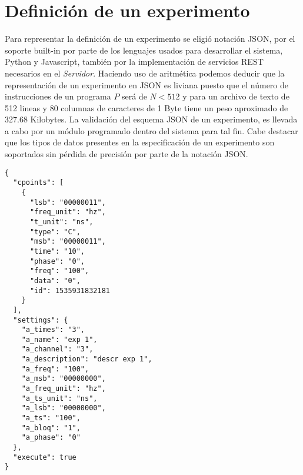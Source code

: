 \section{Definici\'on de un experimento}

Para representar la definici\'on de un experimento se eligi\'o notaci\'on JSON, 
por el soporte built-in por parte de los lenguajes usados para desarrollar el sistema, 
Python y Javascript, tambi\'en por la implementaci\'on de servicios REST necesarios 
en el \textit{Servidor}\cite{json_standar}.
Haciendo uso de aritm\'etica podemos deducir que la representaci\'on de un experimento en JSON
es liviana puesto que el n\'umero de instrucciones de un programa \(P\) ser\'a de \(N < 512 \) 
y para un archivo de texto de 512 lineas y 80 columnas de caracteres de 1 Byte 
tiene un peso aproximado de 327.68 Kilobytes.
La validaci\'on del esquema JSON de un experimento, es llevada a cabo por un m\'odulo programado
dentro del sistema para tal fin.
Cabe destacar que los tipos de datos presentes en la especificaci\'on de un experimento son
soportados sin p\'erdida de precisi\'on por parte de la notaci\'on JSON.\cite{json_ref}


\begin{lstlisting}
{
  "cpoints": [
    {
      "lsb": "00000011",
      "freq_unit": "hz",
      "t_unit": "ns",
      "type": "C",
      "msb": "00000011",
      "time": "10",
      "phase": "0",
      "freq": "100",
      "data": "0",
      "id": 1535931832181
    }
  ],
  "settings": {
    "a_times": "3",
    "a_name": "exp 1",
    "a_channel": "3",
    "a_description": "descr exp 1",
    "a_freq": "100",
    "a_msb": "00000000",
    "a_freq_unit": "hz",
    "a_ts_unit": "ns",
    "a_lsb": "00000000",
    "a_ts": "100",
    "a_bloq": "1",
    "a_phase": "0"
  },
  "execute": true
}
\end{lstlisting}

\newpage

